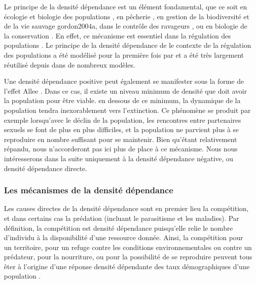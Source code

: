 Le principe de la densité dépendance est un élément fondamental, que ce soit en
écologie et biologie des populations \autocite{kingsland1995a}, en pêcherie
\autocite{rose2001a}, en gestion de la biodiversité et de la vie sauvage
{gordon2004a}, dans le contrôle des ravageurs \autocite{walde1988a}, ou en
biologie de la conservation \autocite{ginzburg1990a}. En effet, ce mécanisme est
essentiel dans la régulation des populations \autocite{murdoch1994a,
turchin1990a}. Le principe de la densité dépendance de le contexte de la
régulation des populations a été modélisé pour la première fois par
\textcite{verhulst1838a} et a été très largement réutilisé depuis dans de
nombreux modèles. 

Une densité dépendance positive peut également se manifester sous la forme de
l'effet Allee \autocite{courchamp1999a}. Dans ce cas, il existe un niveau
minimum de densité que doit avoir la population pour être viable. en dessous de
ce minimum, la dynamique de la population tendra inexorablement vers
l'extinction. Ce phénomène se produit par exemple lorsqu'avec le déclin de la
population, les rencontres entre partenaires sexuels se font de plus en plus
difficiles, et la population ne parvient plus à se reproduire en nombre
suffisant pour se maintenir. Bien qu'étant relativement répandu, nous
n'accorderont pas ici plus de place à ce mécanisme. Nous nous intéresserons dans
la suite uniquement à la densité dépendance négative, ou densité dépendance
directe. 

\subsubsection{Les mécanismes de la densité dépendance}

Les causes directes de la densité dépendance sont en premier lieu la
compétition, et dans certains cas la prédation (incluant le parasitisme et les
maladies). Par définition, la compétition est densité dépendance puisqu'elle
relie le nombre d'individu à la disponibilité d'une ressource donnée. Ainsi, la
compétition pour un territoire, pour un refuge contre les conditions
environnementales ou contre un prédateur, pour la nourriture, ou pour la
possibilité de se reproduire peuvent tous êter à l'origine d'une réponse densité
dépendante des taux démographiques d'une population
\autocite{keddy1989a,begon2009a}.

